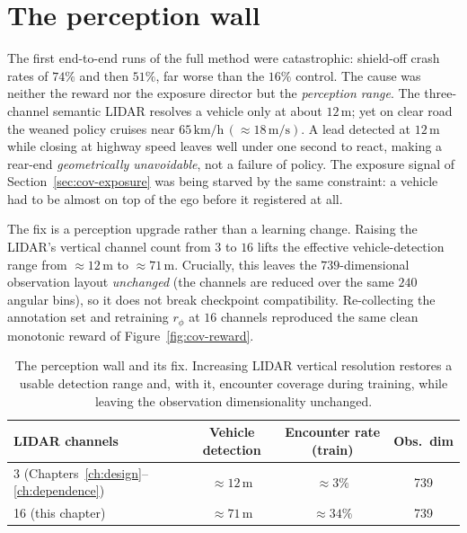 \section{The perception wall}\label{sec:cov-perception}

The first end-to-end runs of the full method were catastrophic: shield-off crash rates of
\(74\%\) and then \(51\%\), far worse than the \(16\%\) control. The cause was neither the
reward nor the exposure director but the \emph{perception range}. The three-channel semantic LIDAR
resolves a vehicle only at about \(12\,\mathrm{m}\); yet on clear road the weaned policy cruises
near \(65\,\mathrm{km/h}\,(\approx 18\,\mathrm{m/s})\). A lead detected at \(12\,\mathrm{m}\)
while closing at highway speed leaves well under one second to react, making a rear-end
\emph{geometrically unavoidable}, not a failure of policy. The exposure signal of
Section~\ref{sec:cov-exposure} was being starved by the same constraint: a vehicle had to be
almost on top of the ego before it registered at all.

The fix is a perception upgrade rather than a learning change. Raising the LIDAR's vertical
channel count from \(3\) to \(16\) lifts the effective vehicle-detection range from
\(\approx12\,\mathrm{m}\) to \(\approx71\,\mathrm{m}\). Crucially, this leaves the
\(739\)-dimensional observation layout \emph{unchanged} (the channels are reduced over the same
\(240\) angular bins), so it does not break checkpoint compatibility. Re-collecting the annotation
set and retraining \(r_\phi\) at \(16\) channels reproduced the same clean monotonic reward of
Figure~\ref{fig:cov-reward}.

\begin{table}[H]
  \centering
  \caption{The perception wall and its fix. Increasing LIDAR vertical resolution restores a usable
           detection range and, with it, encounter coverage during training, while leaving the
           observation dimensionality unchanged.}
  \label{tab:cov-perception}
  \small
  \begin{tabular}{@{}lccc@{}}
    \toprule
    \textbf{LIDAR channels} & \textbf{Vehicle detection} & \textbf{Encounter rate (train)} & \textbf{Obs.\ dim} \\
    \midrule
    3  (Chapters~\ref{ch:design}--\ref{ch:dependence}) & \(\approx 12\,\mathrm{m}\) & \(\approx 3\%\)  & 739 \\
    16 (this chapter)                                  & \(\approx 71\,\mathrm{m}\) & \(\approx 34\%\) & 739 \\
    \bottomrule
  \end{tabular}
\end{table}

